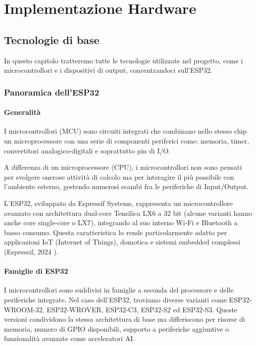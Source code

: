 \chapter{Implementazione Hardware}
\label{chap:implementazione_hardware}
\section{Tecnologie di base}

In questo capitolo tratteremo tutte le tecnologie utilizzate nel progetto, come i microcontrollori e i dispositivi di output,
 concentrandoci sull’ESP32.

\subsection{Panoramica dell’ESP32}

\subsubsection{Generalità}
I microcontrollori (MCU) sono circuiti integrati che combinano nello stesso chip un microprocessore con una serie di componenti periferici
 come: memoria, timer, convertitori analogico-digitali e soprattutto pin di I/O.

A differenza di un microprocessore (CPU), i microcontrollori non sono pensati per svolgere onerose attività di calcolo ma per interagire 
il più possibile con l’ambiente esterno, gestendo numerosi scambi fra le periferiche di Input/Output.

L’ESP32, sviluppato da Espressif Systems, rappresenta un microcontrollore avanzato con architettura dual-core Tensilica LX6 a 32 bit
 (alcune varianti hanno anche core single-core o LX7), integrando al suo interno Wi-Fi e Bluetooth a basso consumo. Questa caratteristica
  lo rende particolarmente adatto per applicazioni IoT (Internet of Things), domotica e sistemi embedded complessi (Espressif, 2024 \citep{Espressif2024}).

\subsubsection{Famiglie di ESP32}
I microcontrollori sono suddivisi in famiglie a seconda del processore e delle periferiche integrate. Nel caso dell’ESP32,
 troviamo diverse varianti come ESP32-WROOM-32, ESP32-WROVER, ESP32-C3, ESP32-S2 ed ESP32-S3.  
Queste versioni condividono la stessa architettura di base ma differiscono per risorse di memoria, numero di GPIO disponibili,
 supporto a periferiche aggiuntive o funzionalità avanzate come acceleratori AI.  


